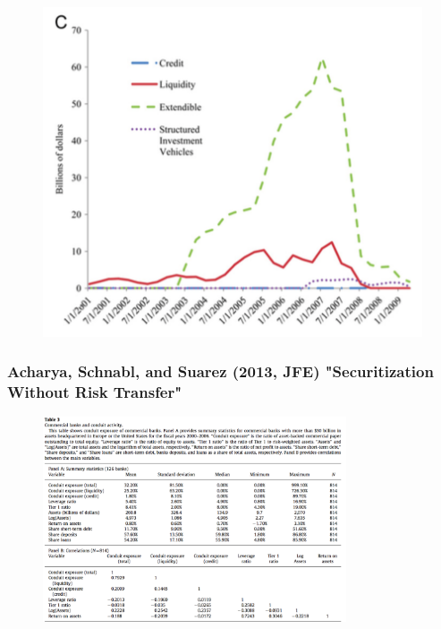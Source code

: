 \documentclass[11pt]{beamer}
\begin{document}
\begin{frame}
\begin{figure}
\begin{minipage}{0.33\textwidth}
\begin{center}
        	\end{center}
         \end{minipage}\begin{minipage}{0.33\textwidth}
	    	\begin{center}
	    		\includegraphics[width=\textwidth]{Figures/ASS2013_Figure3-C.png}
        	\end{center}
         \end{minipage}
    \end{figure}
\end{frame}

\begin{frame}
	\frametitle{Acharya, Schnabl, and Suarez (2013, JFE) "Securitization Without Risk Transfer"}
    \begin{figure}
    	\begin{center}
    	\includegraphics[width=0.8\textwidth]{Figures/ASS2013_Table3.png}
        \end{center}
    \end{figure}
\end{frame}
\end{document}
